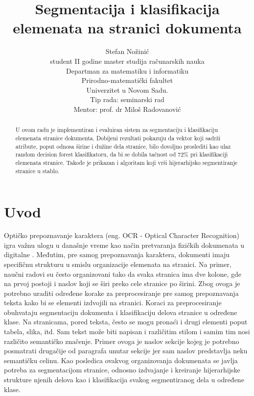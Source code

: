 \documentclass[]{amsart}
\begin{document}
\title{Segmentacija i klasifikacija elemenata na stranici dokumenta}
\author{Stefan Nožinić \\
student II godine master studija računarskih nauka \\
Departman za matematiku i informatiku \\
Prirodno-matematički fakultet \\
Univerzitet u Novom Sadu. \\
Tip rada: seminarski rad \\
Mentor: \MakeLowercase{prof. dr} Miloš Radovanović
}

\begin{abstract}
    U ovom radu je implementiran i evaluiran sistem za segmentaciju i klasifikaciju elemenata stranice dokumenta. 
	Dobijeni rezultati pokazuju da vektor koji sadrži atribute, poput odnosa širine i 
	dužine dela stranice, bilo dovoljno proslediti kao ulaz random decision
    forest klasifikatoru, da bi se dobila tačnost od 72\% pri klasifikaciji elemenata stranice. 
	Takođe je prikazan i algoritam koji vrši hijerarhijsko segmentiranje stranice u stablo.     
\end{abstract}


\maketitle
\newpage


\section{Uvod}
\label{sec:org8295245}

Optičko prepoznavanje karaktera (eng. OCR - Optical Character Recognition) igra važnu ulogu u današnje vreme kao način pretvaranja fizičkih dokumenata u digitalne \cite{mori1999optical}.
Međutim, pre samog prepoznavanja karaktera, dokumenti imaju specifičnu strukturu u smislu organizacije elemenata na stranici. Na primer, naučni radovi su često
organizovani tako da svaka stranica ima dve kolone, gde na prvoj postoji i naslov koji se širi preko cele stranice po širini. Zbog ovoga je potrebno uraditi određene korake za preprocesiranje
pre samog prepoznavanja teksta kako bi se elementi izdvojili na stranici. Koraci za preprocesiranje obuhvataju segmentaciju dokumenta i klasifikaciju delova stranice u određene klase. 
Na stranicama, pored teksta, često se mogu pronaći i drugi elementi poput tabela, slika, itd.
Sam tekst može biti napisan i različitim stilom i samim tim nosi različito semantičko značenje. Primer ovoga je naslov sekcije kojeg je potrebno posmatrati
drugačije od paragrafa unutar sekcije jer sam naslov predstavlja neku semantičku celinu. 
Kao posledica ovakvog organizovanja dokumenata se javlja potreba za segmentacijom stranice, odnosno izdvajanje i kreiranje hijerarhijske strukture njenih delova kao i
klasifikacija svakog segmentiranog dela u određene klase.
\end{document}
